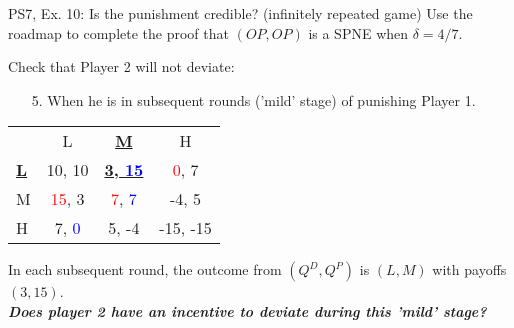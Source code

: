 \begin{frame}{PS7, Ex. 10: Is the punishment credible? (infinitely repeated game)}
    Use the roadmap to complete the proof that $(OP,OP)$ is a SPNE when $\delta=4/7$.\vspace{-4pt}
    \begin{multicols}{2}
      Check that Player 2 will not deviate:
      \begin{itemize}
        \item[5.] When he is in subsequent rounds ('mild' stage) of punishing Player 1.
      \end{itemize}
      \vfill\null\columnbreak
      \vspace{-6pt}
      \begin{table}
        \begin{tabular}{l|c|c|c|}
          \multicolumn{1}{c}{} & \multicolumn{1}{c}{L} & \multicolumn{1}{c}{\textbf{\underline{M}}} & \multicolumn{1}{c}{H} \\\cline{2-4}
          \textbf{\underline{L}} & 10, 10 & \textbf{\underline{3, \textcolor{blue}{15}}} & \textcolor{red}{0}, 7 \\\cline{2-4}
          M & \textcolor{red}{15}, 3 & \textcolor{red}{7}, \textcolor{blue}{7} & -4, 5 \\\cline{2-4}
          H & 7, \textcolor{blue}{0} & 5, -4 & -15, -15 \\\cline{2-4}
        \end{tabular}
      \end{table}
      \vspace{-8pt}
    \end{multicols}
    In each subsequent round, the outcome from $(Q^D,Q^P)$ is $(L,M)$ with payoffs $(3,15)$.\\\medskip
    \textbf{\textit{Does player 2 have an incentive to deviate during this 'mild' stage?}}
    \vfill\null
\end{frame}
